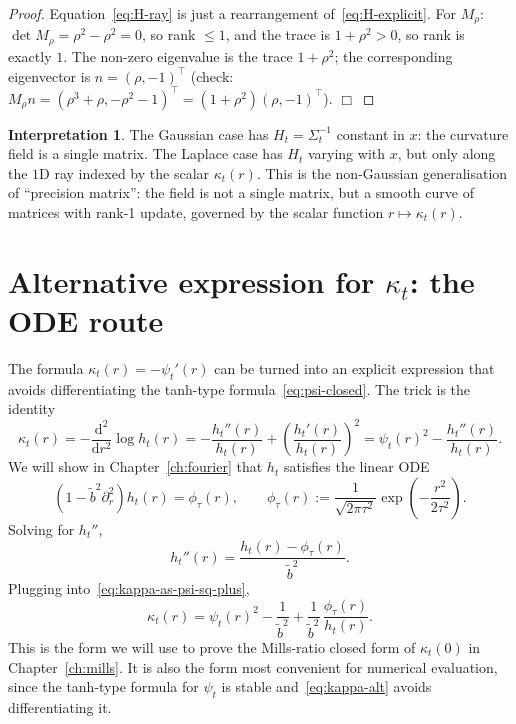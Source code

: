 \documentclass[11pt,a4paper,openany]{book}
\theoremstyle{plainserif}
\theoremstyle{definition}
\theoremstyle{remarkstyle}
\newtheorem*{interpretation}{Interpretation}
\newcommand{\btilde}{\tilde{b}}
\begin{document}
\begin{proof}
Equation~\eqref{eq:H-ray} is just a rearrangement of~\eqref{eq:H-explicit}.
For $M_\rho$: $\det M_\rho = \rho^2 - \rho^2 = 0$, so rank $\le 1$, and the
trace is $1 + \rho^2 > 0$, so rank is exactly $1$. The non-zero eigenvalue
is the trace $1 + \rho^2$; the corresponding eigenvector is $n = (\rho,-1)^\top$
(check: $M_\rho n = (\rho^3+\rho, -\rho^2 -1)^\top = (1+\rho^2)(\rho,-1)^\top$).
$\Box$
\end{proof}

\begin{interpretation}
The Gaussian case has $H_t = \Sigma_t^{-1}$ constant in $x$: the curvature
field is a single matrix. The Laplace case has $H_t$ varying with $x$, but
only along the $1$D ray indexed by the scalar $\kappa_t(r)$. This is the
non-Gaussian generalisation of ``precision matrix'': the field is not a
single matrix, but a smooth curve of matrices with rank-1 update, governed
by the scalar function $r\mapsto \kappa_t(r)$.
\end{interpretation}

\section{Alternative expression for $\kappa_t$: the ODE route}

The formula $\kappa_t(r) = -\psi_t'(r)$ can be turned into an explicit
expression that avoids differentiating the tanh-type formula~\eqref{eq:psi-closed}.
The trick is the identity
\begin{equation}
\kappa_t(r) = -\frac{\mathrm{d}^2}{\mathrm{d}r^2}\log h_t(r)
            = -\frac{h_t''(r)}{h_t(r)} + \left(\frac{h_t'(r)}{h_t(r)}\right)^2
            = \psi_t(r)^2 - \frac{h_t''(r)}{h_t(r)}.
\label{eq:kappa-as-psi-sq-plus}
\end{equation}
We will show in Chapter~\ref{ch:fourier} that $h_t$ satisfies the linear
ODE
\begin{equation}
(1 - \btilde^2 \partial_r^2) h_t(r) = \phi_\tau(r),\qquad
\phi_\tau(r) := \frac{1}{\sqrt{2\pi\tau^2}}\exp\!\left(-\frac{r^2}{2\tau^2}\right).
\label{eq:h-ODE}
\end{equation}
Solving for $h_t''$,
\begin{equation}
h_t''(r) = \frac{h_t(r) - \phi_\tau(r)}{\btilde^2}.
\label{eq:hprimeprime}
\end{equation}
Plugging into~\eqref{eq:kappa-as-psi-sq-plus},
\begin{equation}
\boxed{\;\kappa_t(r) = \psi_t(r)^2 - \frac{1}{\btilde^2} + \frac{1}{\btilde^2}\,\frac{\phi_\tau(r)}{h_t(r)}.\;}
\label{eq:kappa-alt}
\end{equation}
This is the form we will use to prove the Mills-ratio closed form of
$\kappa_t(0)$ in Chapter~\ref{ch:mills}. It is also the form most
convenient for numerical evaluation, since the tanh-type formula for
$\psi_t$ is stable and~\eqref{eq:kappa-alt} avoids differentiating it.
\end{document}
